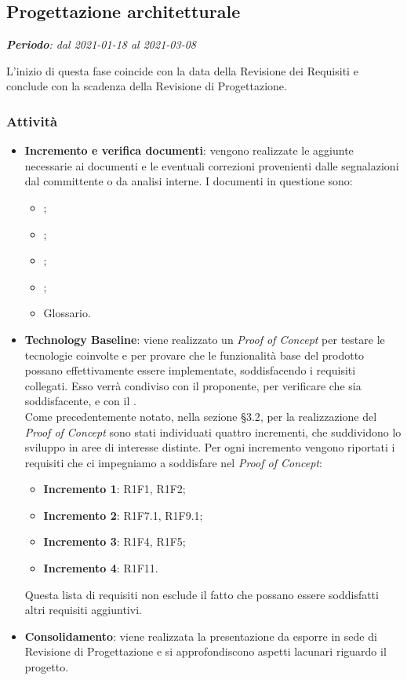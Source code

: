 \subsection{Progettazione architetturale}
\textit{\textbf{Periodo}: dal 2021-01-18 al 2021-03-08}

L'inizio di questa fase coincide con la data della Revisione dei Requisiti e conclude con la scadenza della Revisione di Progettazione.

\subsubsection{Attività}

\begin{itemize}
\item \textbf{Incremento e verifica documenti}: vengono realizzate le aggiunte necessarie ai documenti e le eventuali correzioni provenienti dalle segnalazioni dal committente o da analisi interne. I documenti in questione sono:
\begin{itemize}
\item \NdP{};
\item \AdR{};
\item \PdQ{};
\item \PdP{};
\item Glossario.
\end{itemize}
\item \textbf{Technology Baseline}: viene realizzato un \textit{Proof of Concept} per testare le tecnologie coinvolte e per provare che le funzionalità base del prodotto possano effettivamente essere implementate, soddisfacendo i requisiti collegati. Esso verrà condiviso con il proponente, per verificare che sia soddisfacente, e con il \CR{}.\\ Come precedentemente notato, nella sezione \S{3.2}, per la realizzazione del \textit{Proof of Concept} sono stati individuati quattro incrementi, che suddividono lo sviluppo in  aree di interesse distinte. Per ogni incremento vengono riportati i requisiti che ci impegniamo a soddisfare nel \textit{Proof of Concept}:
\begin{itemize}
\item \textbf{Incremento 1}: R1F1, R1F2;
\item \textbf{Incremento 2}: R1F7.1, R1F9.1;
\item \textbf{Incremento 3}: R1F4, R1F5;
\item \textbf{Incremento 4}: R1F11.
\end{itemize}
Questa lista di requisiti non esclude il fatto che possano essere soddisfatti altri requisiti aggiuntivi.
\item \textbf{Consolidamento}: viene realizzata la presentazione da esporre in sede di Revisione di Progettazione e si approfondiscono aspetti lacunari riguardo il progetto.
\end{itemize}

